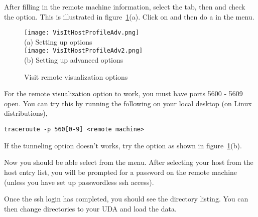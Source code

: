 \documentclass[11pt,fleqn]{book} %
\begin{document}
After filling in the remote machine information, select the  tab, then  and check the  option. This is illustrated in
figure~\ref{VisItHostProfileAdv}(a). Click on  and then do a  in the  menu.
\begin{figure}[h]
  \centering
  \texttt{[image: VisItHostProfileAdv.png]} \\
  (a) Setting up options \\
  \texttt{[image: VisItHostProfileAdv2.png]} \\
  (b) Setting up advanced options
  \caption{Visit remote visualization options}
  \label{VisItHostProfileAdv}
\end{figure}

For the remote visualization option to work, you must have ports 5600
- 5609 open. You can try this by running the following on your local
desktop (on Linux distributions),
\begin{lstlisting}
traceroute -p 560[0-9] <remote machine>
\end{lstlisting}

If the tunneling option doesn't works, try the option as shown in
figure~\ref{VisItHostProfileAdv}(b).

Now you should be able select  from the \Visit {} menu. After
selecting your host from the host entry list, you will be prompted for
a password on the remote machine (unless you have set up passwordless
ssh access).

Once the ssh login has completed, you should see the directory
listing. You can then change directories to your UDA and load the
data.

%
\end{document}
